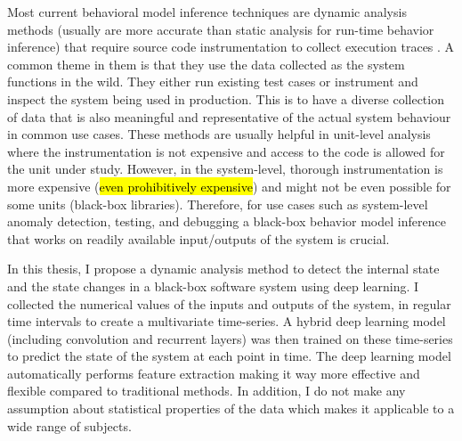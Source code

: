 Most current behavioral model inference techniques are dynamic analysis methods (usually are more accurate than static analysis for run-time behavior inference) that require source code instrumentation to collect execution traces \cite{lo2011mining}. A common theme in them is that they use the data collected as the system functions in the wild. They either run existing test cases or instrument and inspect the system being used in production. 
This is to have a diverse collection of data that is also meaningful and representative of the actual system behaviour in common use cases. 
These methods are usually helpful in unit-level analysis where the instrumentation is not expensive and access to the code is allowed for the unit under study. However, in the system-level, thorough instrumentation is more expensive (\hl{even prohibitively expensive\cite{mashhadi2019empirical}}) and might not be even possible for some units (black-box libraries). Therefore, for use cases such as system-level anomaly detection, testing, and debugging a black-box behavior model inference that works on readily available input/outputs of the system is crucial. 


In this thesis, I propose a dynamic analysis method to detect the internal state and the state changes in a black-box software system using deep learning. I collected the numerical values of the inputs and outputs of the system, in regular time intervals to create a multivariate time-series. A hybrid deep learning model (including convolution and recurrent layers) was then trained on these time-series to predict the state of the system at each point in time. The deep learning model automatically performs feature extraction making it way more effective and flexible compared to traditional methods. In addition, I do not make any assumption about statistical properties of the data which makes it applicable to a wide range of subjects.   


